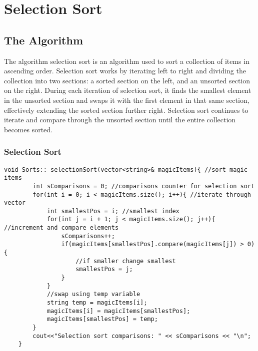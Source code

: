 \documentclass[letterpaper, 10pt,DIV=13]{scrartcl}
\numberwithin{equation}{section} %
\numberwithin{figure}{section} %
\numberwithin{table}{section} %
\begin{document}

\pagebreak

\section{Selection Sort}

\subsection{The Algorithm}
The algorithm selection sort is an algorithm used to sort a collection of items in ascending order. Selection sort works by iterating left to right and dividing the collection into two sections: a sorted section on the left, and an unsorted section on the right. During each iteration of selection sort, it finds the smallest element in the unsorted section and swaps it with the first element in that same section, effectively extending the sorted section further right. Selection sort continues to iterate and compare through the unsorted section until the entire collection becomes sorted.

\subsubsection*{Selection Sort}
    \lstset{numbers=left, numberstyle=\tiny, stepnumber=1, numbersep=5pt, basicstyle=\footnotesize\ttfamily}
    \begin{lstlisting}[frame=single, ]
    void Sorts:: selectionSort(vector<string>& magicItems){ //sort magic items
        int sComparisons = 0; //comparisons counter for selection sort
        for(int i = 0; i < magicItems.size(); i++){ //iterate through vector
            int smallestPos = i; //smallest index
            for(int j = i + 1; j < magicItems.size(); j++){ //increment and compare elements
                sComparisons++;
                if(magicItems[smallestPos].compare(magicItems[j]) > 0){
                    //if smaller change smallest
                    smallestPos = j;
                }
            }
            //swap using temp variable
            string temp = magicItems[i];
            magicItems[i] = magicItems[smallestPos];
            magicItems[smallestPos] = temp;
        }
        cout<<"Selection sort comparisons: " << sComparisons << "\n";
    }
    
\end{lstlisting}
\end{document}
